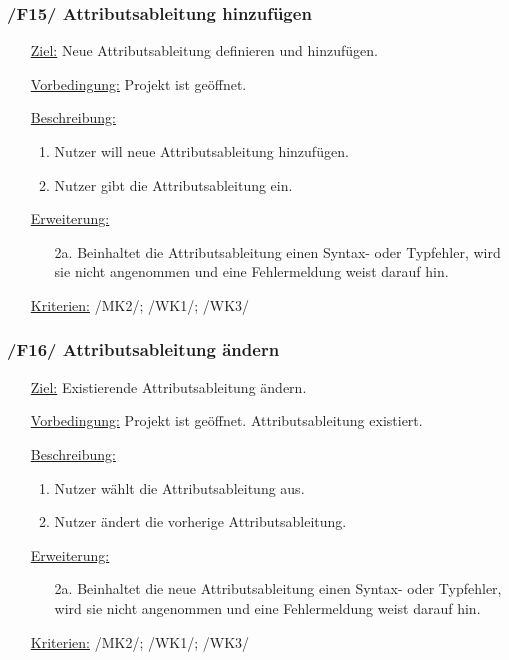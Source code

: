 \documentclass{article}
\begin{document}
\subsubsection*{/F15/ Attributsableitung hinzufügen}
\begin{itemize}
    \item[\underline{Ziel:}] Neue Attributsableitung definieren und hinzufügen. 
    \item[\underline{Vorbedingung:}] Projekt ist geöffnet.
    \item[\underline{Beschreibung:}]
    \begin{enumerate}
        \item Nutzer will neue Attributsableitung hinzufügen.
        \item Nutzer gibt die Attributsableitung ein.
    \end{enumerate}
    \item[\underline{Erweiterung:}]
    \begin{itemize}
        \item[2a.] Beinhaltet die Attributsableitung einen Syntax- oder Typfehler, wird sie nicht angenommen und eine Fehlermeldung weist darauf hin.
    \end{itemize}
    \item[\underline{Kriterien:}] /MK2/; /WK1/; /WK3/
\end{itemize}

\subsubsection*{/F16/ Attributsableitung ändern}
\begin{itemize}
    \item[\underline{Ziel:}] Existierende Attributsableitung ändern.
    \item[\underline{Vorbedingung:}] Projekt ist geöffnet. Attributsableitung existiert.
    \item[\underline{Beschreibung:}]
    \begin{enumerate}
        \item Nutzer wählt die Attributsableitung aus.
        \item Nutzer ändert die vorherige Attributsableitung.
    \end{enumerate}
    \item[\underline{Erweiterung:}]
    \begin{itemize}
        \item[2a.] Beinhaltet die neue Attributsableitung einen Syntax- oder Typfehler, wird sie nicht angenommen und eine Fehlermeldung weist darauf hin.
    \end{itemize}
    \item[\underline{Kriterien:}] /MK2/; /WK1/; /WK3/
\end{itemize}
\end{document}
